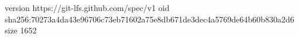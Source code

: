 version https://git-lfs.github.com/spec/v1
oid sha256:70273a4da43e96706c73eb71602a75e8db671de3dec4a5769de64b60b830a2d6
size 1652
